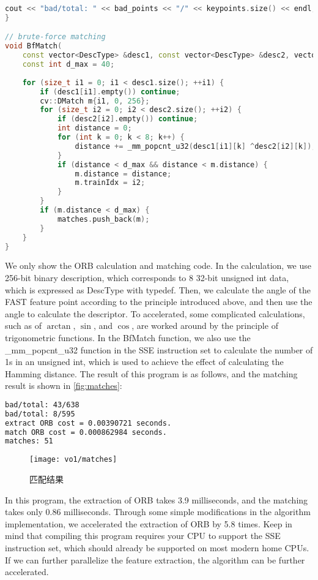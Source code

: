 \begin{lstlisting}[language=c++,caption=slambook2/ch7/orb_self.cpp（片段）]
    cout << "bad/total: " << bad_points << "/" << keypoints.size() << endl;
}

// brute-force matching
void BfMatch(
    const vector<DescType> &desc1, const vector<DescType> &desc2, vector<cv::DMatch> &matches) {
    const int d_max = 40;
    
    for (size_t i1 = 0; i1 < desc1.size(); ++i1) {
        if (desc1[i1].empty()) continue;
        cv::DMatch m{i1, 0, 256};
        for (size_t i2 = 0; i2 < desc2.size(); ++i2) {
            if (desc2[i2].empty()) continue;
            int distance = 0;
            for (int k = 0; k < 8; k++) {
                distance += _mm_popcnt_u32(desc1[i1][k] ^desc2[i2][k]);
            }
            if (distance < d_max && distance < m.distance) {
                m.distance = distance;
                m.trainIdx = i2;
            }
        }
        if (m.distance < d_max) {
            matches.push_back(m);
        }
    }
}
\end{lstlisting}
We only show the ORB calculation and matching code. In the calculation, we use 256-bit binary description, which corresponds to 8 32-bit unsigned int data, which is expressed as DescType with typedef. Then, we calculate the angle of the FAST feature point according to the principle introduced above, and then use the angle to calculate the descriptor. To accelerated, some complicated calculations, such as of $\arctan$, $\sin$, and $\cos$, are worked around by the principle of trigonometric functions. In the BfMatch function, we also use the \_mm\_popcnt\_u32 function in the SSE instruction set to calculate the number of 1s in an unsigned int, which is used to achieve the effect of calculating the Hamming distance. The result of this program is as follows, and the matching result is shown in \autoref{fig:matches}:

\begin{lstlisting}[language=sh,caption=终端输出：]
bad/total: 43/638
bad/total: 8/595
extract ORB cost = 0.00390721 seconds.
match ORB cost = 0.000862984 seconds.
matches: 51
\end{lstlisting}

\begin{figure}[!htp]
    \centering
    \texttt{[image: vo1/matches]}
    \caption{匹配结果}
    \label{fig:matches}
\end{figure}

In this program, the extraction of ORB takes 3.9 milliseconds, and the matching takes only 0.86 milliseconds. Through some simple modifications in the algorithm implementation, we accelerated the extraction of ORB by 5.8 times. Keep in mind that compiling this program requires your CPU to support the SSE instruction set, which should already be supported on most modern home CPUs. If we can further parallelize the feature extraction, the algorithm can be further accelerated.

